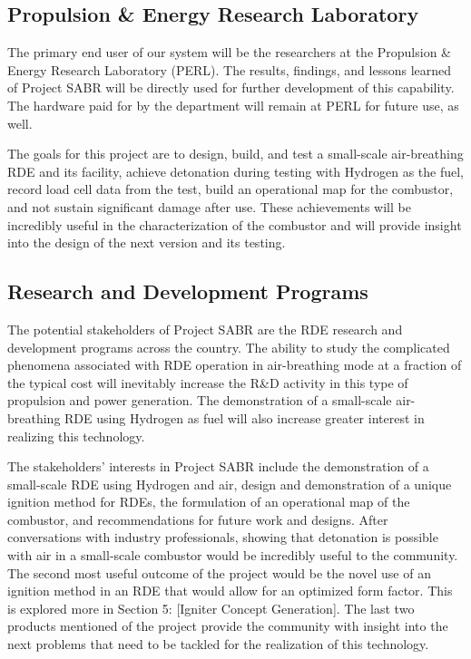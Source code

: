 \subsection{Propulsion \& Energy Research Laboratory}

The primary end user of our system will be the researchers at the Propulsion \& Energy Research Laboratory (PERL). The results, findings, and lessons learned of Project SABR will be directly used for further development of this capability. The hardware paid for by the department will remain at PERL for future use, as well.

The goals for this project are to design, build, and test a small-scale air-breathing RDE and its facility, achieve detonation during testing with Hydrogen as the fuel, record load cell data from the test, build an operational map for the combustor, and not sustain significant damage after use. These achievements will be incredibly useful in the characterization of the combustor and will provide insight into the design of the next version and its testing. 

\subsection{Research and Development Programs}

The potential stakeholders of Project SABR are the RDE research and development programs across the country. The ability to study the complicated phenomena associated with RDE operation in air-breathing mode at a fraction of the typical cost will inevitably increase the R\&D activity in this type of propulsion and power generation. The demonstration of a small-scale air-breathing RDE using Hydrogen as fuel will also increase greater interest in realizing this technology.

The stakeholders’ interests in Project SABR include the demonstration of a small-scale RDE using Hydrogen and air, design and demonstration of a unique ignition method for RDEs, the formulation of an operational map of the combustor, and recommendations for future work and designs. After conversations with industry professionals, showing that detonation is possible with air in a small-scale combustor would be incredibly useful to the community. The second most useful outcome of the project would be the novel use of an ignition method in an RDE that would allow for an optimized form factor. This is explored more in Section 5: [Igniter Concept Generation]. The last two products mentioned of the project provide the community with insight into the next problems that need to be tackled for the realization of this technology.

